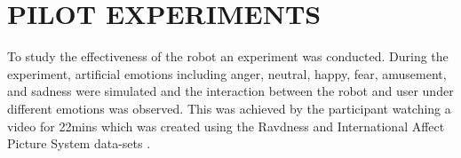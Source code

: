 \documentclass[letterpaper, 10 pt, conference]{ieeeconf}  %
\begin{document}



\section{PILOT EXPERIMENTS}

To study the effectiveness of the robot an experiment was conducted. During
the experiment, artificial emotions including anger, neutral, happy, fear, amusement, and sadness were simulated and the interaction between the robot and user under different emotions was observed. This was achieved by the participant watching a video for 22mins which was created using the Ravdness and International Affect Picture System data-sets \cite{}. 
\end{document}

